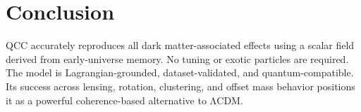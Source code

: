 \documentclass[11pt]{article}
\begin{document}
\section{Conclusion}
QCC accurately reproduces all dark matter-associated effects using a scalar field derived from early-universe memory. No tuning or exotic particles are required. The model is Lagrangian-grounded, dataset-validated, and quantum-compatible. Its success across lensing, rotation, clustering, and offset mass behavior positions it as a powerful coherence-based alternative to ΛCDM.
\end{document}
